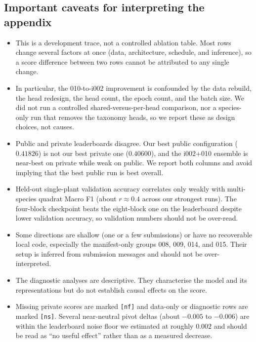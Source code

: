 \subsection{Important caveats for interpreting the appendix}
\label{sec:appendix_caveats}
\begin{itemize}
  \item This is a development trace, not a controlled ablation table. Most rows change
  several factors at once (data, architecture, schedule, and inference), so a score
  difference between two rows cannot be attributed to any single change.
  \item In particular, the 010-to-i002 improvement is confounded by the data rebuild,
  the head redesign, the head count, the epoch count, and the batch size. We did not
  run a controlled shared-versus-per-head comparison, nor a species-only run that
  removes the taxonomy heads, so we report these as design choices, not causes.
  \item Public and private leaderboards disagree. Our best public configuration
  ($0.41826$) is not our best private one ($0.40600$), and the i002+010 ensemble is
  near-best on private while weak on public. We report both columns and avoid implying
  that the best public run is best overall.
  \item Held-out single-plant validation accuracy correlates only weakly with
  multi-species quadrat Macro F1 (about $r{\approx}0.4$ across our strongest runs). The
  four-block checkpoint beats the eight-block one on the leaderboard despite lower
  validation accuracy, so validation numbers should not be over-read.
  \item Some directions are shallow (one or a few submissions) or have no recoverable
  local code, especially the manifest-only groups 008, 009, 014, and 015. Their setup
  is inferred from submission messages and should not be over-interpreted.
  \item The diagnostic analyses are descriptive. They characterise the model and its
  representations but do not establish causal effects on the score.
  \item Missing private scores are marked \texttt{[nf]} and data-only or diagnostic rows
  are marked \texttt{[ns]}. Several near-neutral pivot deltas (about $-0.005$ to
  $-0.006$) are within the leaderboard noise floor we estimated at roughly $0.002$ and
  should be read as ``no useful effect'' rather than as a measured decrease.
\end{itemize}
